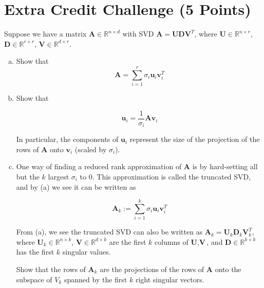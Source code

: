 \section{Extra Credit Challenge (5 Points)}
Suppose we have a matrix $\textbf{A} \in \mathbb{R}^{n \times d}$ with SVD $\textbf{A} = \textbf{U} \textbf{D}\textbf{V}^{T}$, where $\textbf{U} \in \mathbb{R}^{n \times r}$, $\textbf{D} \in \mathbb{R}^{r \times r}$, $\textbf{V} \in \mathbb{R}^{d \times r}.$
\begin{enumerate}[(a)]
    \item  {} Show that  
    \begin{equation}
    \textbf{A} = \sum_{i=1}^{r} \sigma_{i} \textbf{u}_{i} \textbf{v}_{i}^{T} 
    \label{svd_sum}
    \end{equation}
    
    \newpage
    
    \item {} Show that 
    
    \begin{equation}
    \textbf{u}_i = \frac{1}{\sigma_{i}} \textbf{A}\textbf{v}_{i}
    \label{what_is_u}
    \end{equation}
    
    In particular, the components of $\textbf{u}_i$ represent the size of the projection of the rows of $\textbf{A}$ onto $\textbf{v}_i$ (scaled by $\sigma_{i}$).
    
    \newpage
    
    \item {} One way of finding a reduced rank approximation of $\textbf{A}$ is by hard-setting all but the $k$ largest $\sigma_i$ to 0. This approximation is called the truncated SVD, and by (a) we see it can be written as 
   
    \begin{equation}
    \textbf{A}_{k} := \sum_{i=1}^{k} \sigma_{i} \textbf{u}_{i} \textbf{v}_{i}^{T}
    \label{reduced_svd_trunc}
    \end{equation}
   
    From (a), we see the truncated SVD can also be written as $\textbf{A}_{k} = \textbf{U}_k \textbf{D}_k \textbf{V}^{T}_k$, where $\textbf{U}_k \in \mathbb{R}^{n \times k}$, $\textbf{V} \in \mathbb{R}^{d \times k}$ are the first $k$ columns of $\textbf{U}, \textbf{V}$, and $\textbf{D} \in \mathbb{R}^{k \times k}$ has the first $k$ singular values.\newline
    
    Show that the rows of $\textbf{A}_{k}$ are the projections of the rows of $\textbf{A}$ onto the subspace of $V_{k}$ spanned by the first $k$ right singular vectors.  \newline
    

\end{enumerate}
